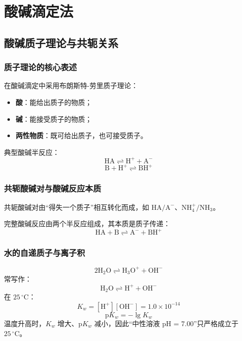 \documentclass[12pt,a4paper]{article}
\numberwithin{equation}{section}
\begin{document}
\newpage
\section{酸碱滴定法}

\subsection{酸碱质子理论与共轭关系}

\subsubsection{质子理论的核心表述}
在酸碱滴定中采用布朗斯特-劳里质子理论：
\begin{itemize}
    \item \textbf{酸}：能给出质子的物质；
    \item \textbf{碱}：能接受质子的物质；
    \item \textbf{两性物质}：既可给出质子，也可接受质子。
\end{itemize}

典型酸碱半反应：
\begin{equation}
\mathrm{HA}\rightleftharpoons \mathrm{H^+}+\mathrm{A^-}
\end{equation}
\begin{equation}
\mathrm{B}+\mathrm{H^+}\rightleftharpoons \mathrm{BH^+}
\end{equation}

\subsubsection{共轭酸碱对与酸碱反应本质}
共轭酸碱对由“得失一个质子”相互转化而成，如 $\mathrm{HA/A^-}$、$\mathrm{NH_4^+/NH_3}$。

完整酸碱反应由两个半反应组成，其本质是质子传递：
\begin{equation}
\mathrm{HA}+\mathrm{B}\rightleftharpoons \mathrm{A^-}+\mathrm{BH^+}
\end{equation}

\subsubsection{水的自递质子与离子积}
\begin{equation}
2\mathrm{H_2O}\rightleftharpoons \mathrm{H_3O^+}+\mathrm{OH^-}
\end{equation}
常写作：
\begin{equation}
\mathrm{H_2O}\rightleftharpoons \mathrm{H^+}+\mathrm{OH^-}
\end{equation}
在 $25\,^{\circ}\mathrm{C}$：
\begin{equation}
K_w=[\mathrm{H^+}][\mathrm{OH^-}]=1.0\times 10^{-14}
\end{equation}
\begin{equation}
\mathrm{p}K_w=-\lg K_w
\end{equation}
温度升高时，$K_w$ 增大、$\mathrm{p}K_w$ 减小，因此“中性溶液 pH = 7.00”只严格成立于
$25\,^{\circ}\mathrm{C}$。
\end{document}
